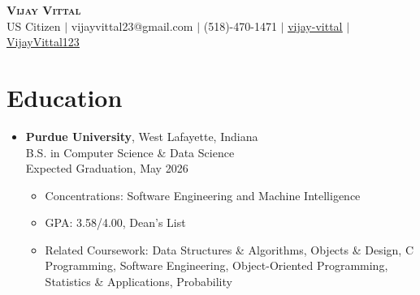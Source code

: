 \documentclass[letterpaper,11pt]{article}
\begin{document}
\begin{center}
    \textbf{\Large \scshape Vijay Vittal} \\ \vspace{1pt}
    \small US Citizen $|$ vijayvittal23@gmail.com $|$ (518)-470-1471 $|$ 
    \href{https://www.linkedin.com/in/vijay-vittal}{\underline{vijay-vittal}} $|$
    \href{https://github.com/VijayVittal123}{\underline{VijayVittal123}}
\end{center}

\section*{Education}
\begin{itemize}[leftmargin=0.15in, label={}]
\item{
    \textbf{Purdue University}, West Lafayette, Indiana \\
    B.S. in Computer Science \& Data Science \\
    Expected Graduation, May 2026
    \begin{itemize}
        \item Concentrations: Software Engineering and Machine Intelligence
        \item GPA: 3.58/4.00, Dean’s List
        \item Related Coursework: Data Structures \& Algorithms, Objects \& Design, C Programming, Software Engineering, Object-Oriented Programming, Statistics \& Applications, Probability
    \end{itemize}
}
\end{itemize}

\end{document}
